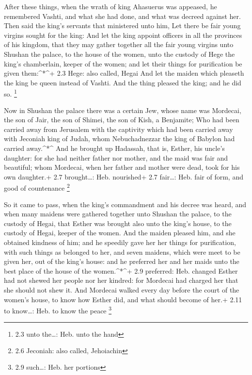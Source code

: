  After these things, when the wrath of king Ahasuerus was
appeased, he remembered Vashti, and what she had done, and what was
decreed against her.  Then said the king's servants that
ministered unto him, Let there be fair young virgins sought for the
king:  And let the king appoint officers in all the
provinces of his kingdom, that they may gather together all the fair
young virgins unto Shushan the palace, to the house of the women, unto
the custody of Hege the king's chamberlain, keeper of the women; and let
their things for purification be given them:\^{}*\^{}+ 2.3 Hege: also
called, Hegai  And let the maiden which pleaseth the king be
queen instead of Vashti. And the thing pleased the king; and he did so.
\footnote{2.3 unto the\ldots: Heb. unto the hand}

 Now in Shushan the palace there was a certain Jew, whose
name was Mordecai, the son of Jair, the son of Shimei, the son of Kish,
a Benjamite;  Who had been carried away from Jerusalem with
the captivity which had been carried away with Jeconiah king of Judah,
whom Nebuchadnezzar the king of Babylon had carried away.\^{}*\^{}
 And he brought up Hadassah, that is, Esther, his uncle's
daughter: for she had neither father nor mother, and the maid was fair
and beautiful; whom Mordecai, when her father and mother were dead, took
for his own daughter.+ 2.7 brought\ldots: Heb. nourished+ 2.7
fair\ldots: Heb. fair of form, and good of countenance \footnote{2.6
  Jeconiah: also called, Jehoiachin}

 So it came to pass, when the king's commandment and his
decree was heard, and when many maidens were gathered together unto
Shushan the palace, to the custody of Hegai, that Esther was brought
also unto the king's house, to the custody of Hegai, keeper of the
women.  And the maiden pleased him, and she obtained
kindness of him; and he speedily gave her her things for purification,
with such things as belonged to her, and seven maidens, which were meet
to be given her, out of the king's house: and he preferred her and her
maids unto the best place of the house of the women.\^{}*\^{}+ 2.9
preferred: Heb. changed  Esther had not shewed her people
nor her kindred: for Mordecai had charged her that she should not shew
it.  And Mordecai walked every day before the court of the
women's house, to know how Esther did, and what should become of her.+
2.11 to know\ldots: Heb. to know the peace \footnote{2.9 such\ldots:
  Heb. her portions}

